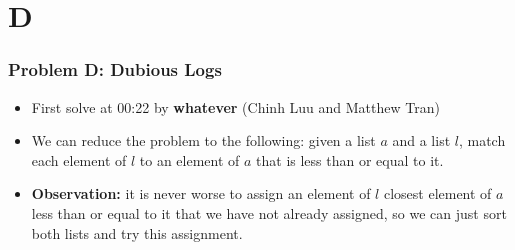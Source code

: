 \section{D}%
\label{sec:d}

\begin{frame}
  \frametitle{Problem D: Dubious Logs}

  \begin{itemize}
    \item First solve at 00:22 by \textbf{whatever} (Chinh Luu and Matthew Tran)
    \item We can reduce the problem to the following: given a list $a$ and a list $l$,
      match each element of $l$ to an element of $a$ that is less than or equal to it.
    \item \textbf{Observation:} it is never worse to assign an element of $l$ closest
      element of $a$ less than or equal to it that we have not already assigned, so we
      can just sort both lists and try this assignment.
  \end{itemize}
\end{frame}
